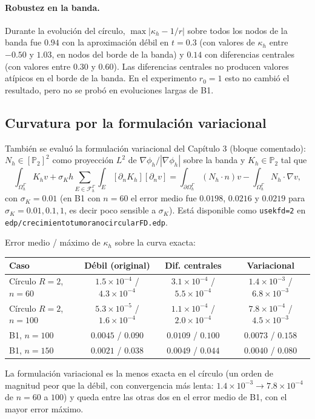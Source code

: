 \paragraph{Robustez en la banda.} Durante la evolución del círculo, $\max|\kappa_h-1/r|$ sobre todos los nodos de la banda fue $0.94$ con la aproximación débil en $t=0.3$ (con valores de $\kappa_h$ entre $-0.50$ y $1.03$, en nodos del borde de la banda) y $0.14$ con diferencias centrales (con valores entre $0.30$ y $0.60$). Las diferencias centrales no producen valores atípicos en el borde de la banda. En el experimento $r_0=1$ esto no cambió el resultado, pero no se probó en evoluciones largas de B1.

\subsection{Curvatura por la formulación variacional}

También se evaluó la formulación variacional del Capítulo 3 (bloque comentado): $N_h\in[\mathbb{P}_2]^2$ como proyección $L^2$ de $\nabla\phi_h/|\nabla\phi_h|$ sobre la banda y $K_h\in\mathbb{P}_2$ tal que
\[
\int_{\Omega_h^\Gamma}K_hv+\sigma_K h\sum_{E\in\mathcal{F}_h^\Gamma}\int_E[\partial_nK_h][\partial_nv]
=\int_{\partial\Omega_h^\Gamma}(N_h\cdot n)v-\int_{\Omega_h^\Gamma}N_h\cdot\nabla v ,
\]
con $\sigma_K=0.01$ (en B1 con $n=60$ el error medio fue $0.0198$, $0.0216$ y $0.0219$ para $\sigma_K=0.01,0.1,1$, es decir poco sensible a $\sigma_K$). Está disponible como \texttt{usekfd=2} en \texttt{edp/crecimientotumoranocircularFD.edp}.

Error medio / máximo de $\kappa_h$ sobre la curva exacta:
\begin{center}
\begin{tabular}{lccc}
\toprule
Caso & Débil (original) & Dif. centrales & Variacional\\
\midrule
Círculo $R=2$, $n=60$ & $1.5\times10^{-4}$ / $4.3\times10^{-4}$ & $3.1\times10^{-4}$ / $5.5\times10^{-4}$ & $1.4\times10^{-3}$ / $6.8\times10^{-3}$\\
Círculo $R=2$, $n=100$ & $5.3\times10^{-5}$ / $1.6\times10^{-4}$ & $1.1\times10^{-4}$ / $2.0\times10^{-4}$ & $7.8\times10^{-4}$ / $4.5\times10^{-3}$\\
B1, $n=100$ & $0.0045$ / $0.090$ & $0.0109$ / $0.100$ & $0.0073$ / $0.158$\\
B1, $n=150$ & $0.0021$ / $0.038$ & $0.0049$ / $0.044$ & $0.0040$ / $0.080$\\
\bottomrule
\end{tabular}
\end{center}
La formulación variacional es la menos exacta en el círculo (un orden de magnitud peor que la débil, con convergencia más lenta: $1.4\times10^{-3}\to7.8\times10^{-4}$ de $n=60$ a $100$) y queda entre las otras dos en el error medio de B1, con el mayor error máximo.

